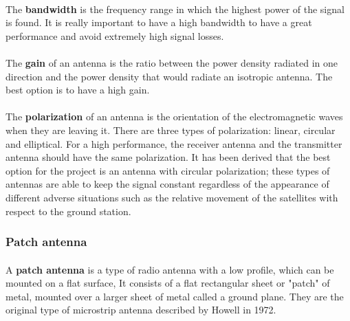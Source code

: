 \paragraph{}The \textbf{bandwidth} is the frequency range in which the highest power of the signal is found. It is really important to have a high bandwidth to have a great performance and avoid extremely high signal losses.

\paragraph{}The \textbf{gain} of an antenna is the ratio between the power density radiated in one direction and the power density that would radiate an isotropic antenna. The best option is to have a high gain. 

\paragraph{}The \textbf{polarization} of an antenna is the orientation of the electromagnetic waves when they are leaving it. There are three types of polarization: linear, circular and elliptical. For a high performance, the receiver antenna and the transmitter antenna should have the same polarization. It has been derived that the best option for the project is an antenna with circular polarization; these types of antennas are able to keep the signal constant regardless of the appearance of different adverse situations such as the relative movement of the satellites with respect to the ground station. 

\subsubsection{Patch antenna}
\paragraph{}A \textbf{patch antenna} is a type of radio antenna with a low profile, which can be mounted on a flat surface, It consists of a flat rectangular sheet or "patch" of metal, mounted over a larger sheet of metal called a ground plane. They are the original type of microstrip antenna described by Howell in 1972. \cite{patch}

